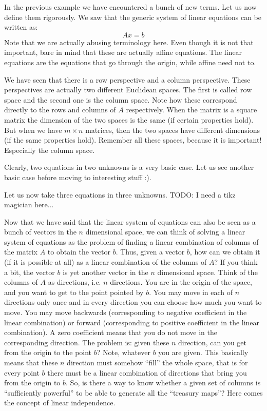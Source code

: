\documentclass[computationalMathematics.tex]{subfiles}
\begin{document}
\par In the previous example we have encountered a bunch of new terms. Let us now define them rigorously. We saw that the generic system of linear equations can be written as:
\[
    A x = b
\]
Note that we are actually abusing terminology here. Even though it is not that important, bare in mind that these are actually affine equations. The linear equations are the equations that go through the origin, while affine need not to.
\par We have seen that there is a row perspective and a column perspective. These perspectives are actually two different Euclidean spaces. The first is called row space and the second one is the column space. Note how these correspond directly to the rows and columns of $A$ respectively. When the matrix is a square matrix the dimension of the two spaces is the same (if certain properties hold). But when we have $m \times n$ matrices, then the two spaces have different dimensions (if the same properties hold). Remember all these spaces, because it is important! Especially the column space.
\par Clearly, two equations in two unknowns is a very basic case. Let us see another basic case before moving to interesting stuff :).
\begin{example}
    Let us now take three equations in three unknowns.  TODO: I need a tikz magician here...
\end{example}
\par Now that we have said that the linear system of equations can also be seen as a bunch of vectors in the $n$ dimensional space, we can think of solving a linear system of equations as the problem of finding a linear combination of columns of the matrix $A$ to obtain the vector $b$. Thus, given a vector $b$, how can we obtain it (if it is possible at all) as a linear combination of the columns of $A$? If you think a bit, the vector $b$ is yet another vector in the $n$ dimensional space. Think of the columns of $A$ as directions, i.e. $n$ directions. You are in the origin of the space, and you want to get to the point pointed by $b$. You may move in each of $n$ directions only once and in every direction you can choose how much you want to move. You may move backwards (corresponding to negative coefficient in the linear combination) or forward (corresponding to positive coefficient in the linear combination). A zero coefficient means that you do not move in the corresponding direction. The problem is: given these $n$ direction, can you get from the origin to the point $b$? Note, whatever $b$ you are given. This basically means that these $n$ direction must somehow ``fill'' the whole space, that is for every point $b$ there must be a linear combination of directions that bring you from the origin to $b$. So, is there a way to know whether a given set of columns is ``sufficiently powerful'' to be able to generate all the ``treasury maps''? Here comes the concept of linear independence.
\end{document}
